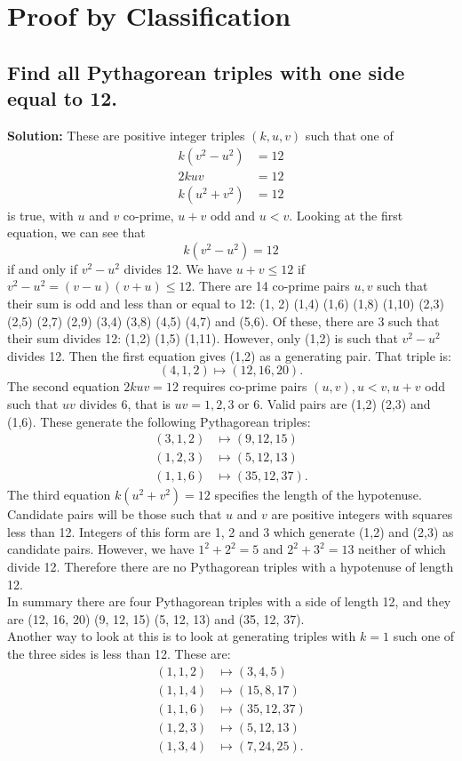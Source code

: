 \documentclass{article}
\newcommand{\exercise}[1]{\subsection{\normalfont #1}}
\newcommand{\solution}{\indent\indent \textbf{Solution: }}
\begin{document}
\section{Proof by Classification}
\exercise{Find all Pythagorean triples with one side equal to 12.} 
\solution
These are positive integer triples $(k, u, v)$ such that one of
\begin{align}
k(v^2 - u^2) &= 12\\
2kuv &= 12 \\
k(u^2 + v^2) &= 12
\end{align}
is true, with $u$ and $v$ co-prime, $u+v$ odd and $u<v$. Looking at the first equation, we can see that 
$$k(v^2 - u^2) = 12$$
if and only if $v^2-u^2$ divides 12. We have $u+v \leq 12$ if $v^2-u^2 = (v-u)(v+u) \leq 12$. There are 14 co-prime pairs $u,v$ such that their sum is odd and less than or equal to 12: (1, 2) (1,4) (1,6) (1,8) (1,10) (2,3) (2,5) (2,7) (2,9) (3,4) (3,8) (4,5) (4,7) and (5,6). Of these, there are 3 such that their sum divides 12: (1,2) (1,5) (1,11). However, only (1,2) is such that $v^2-u^2$ divides 12. Then the first equation gives (1,2) as a generating pair. That triple is:
$$(4,1,2) \mapsto (12, 16, 20).$$
\indent The second equation $2kuv = 12$ requires co-prime pairs $(u,v), u<v, u+v$ odd such that $uv$ divides 6, that is $uv= 1,2,3$ or 6. Valid pairs are (1,2) (2,3) and (1,6). These generate the following Pythagorean triples:
\begin{align*}
(3,1,2) &\mapsto (9, 12, 15) \\
(1,2,3) &\mapsto (5, 12, 13) \\
(1,1,6) &\mapsto (35, 12, 37).
\end{align*}
\indent The third equation $k(u^2 + v^2) = 12$ specifies the length of the hypotenuse. Candidate pairs will be those such that $u$ and $v$ are positive integers with squares less than 12. Integers of this form are 1, 2 and 3 which generate (1,2) and (2,3) as candidate pairs. However, we have $1^2 + 2^2 = 5$ and $2^2 + 3^2 = 13$ neither of which divide 12. Therefore there are no Pythagorean triples with a hypotenuse of length 12. \\
\indent In summary there are four Pythagorean triples with a side of length 12, and they are (12, 16, 20) (9, 12, 15) (5, 12, 13) and (35, 12, 37). \vspace{16pt}\\
\indent Another way to look at this is to look at generating triples with $k=1$ such one of the three sides is less than 12. These are:
\begin{align*}
(1,1,2) &\mapsto (3,4,5) \\
(1,1,4) &\mapsto (15,8,17) \\
(1,1,6) &\mapsto (35,12,37) \\
(1,2,3) &\mapsto (5,12,13) \\
(1,3,4) &\mapsto (7, 24, 25).
\end{align*}
\end{document}
